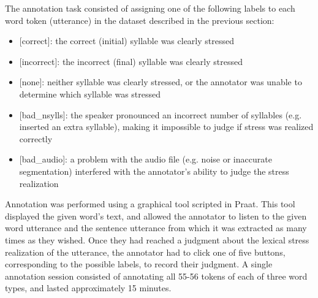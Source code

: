 \documentclass[a4paper]{article}
\begin{document}
		The annotation task consisted of assigning one of the following labels to each word token (utterance) in the dataset described in the previous section:
		\begin{itemize}
	\item{[correct]: 
	the correct (initial) syllable
	was clearly stressed
	}
	\item{[incorrect]: 
	the incorrect (final) syllable
	was clearly stressed
	}
	\item{[none]: 
	neither syllable was clearly stressed, 
	or the annotator was unable to determine which syllable was stressed}
	\item{[bad\_nsylls]: the speaker pronounced an incorrect number of syllables (e.g. inserted an extra syllable), making it impossible to judge if stress was realized correctly}
	\item{[bad\_audio]: a problem with the audio file (e.g. noise or inaccurate segmentation) interfered with the annotator's ability to judge the stress realization}
	 \end{itemize}
	 
	 Annotation was performed using a graphical tool scripted in Praat. This tool displayed the given word's text, and allowed the annotator to listen to the given word utterance and the sentence utterance from which it was extracted as many times as they wished. Once they had reached a judgment about the lexical stress realization of the utterance, the annotator had to click one of five buttons, corresponding to the possible labels, to record their judgment.
	 A single annotation session consisted of annotating all 55-56 tokens of each of three word types, and lasted approximately 15 minutes.
		
\end{document}
